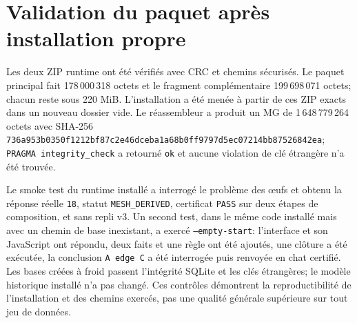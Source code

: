 \documentclass[11pt,a4paper]{book}
\begin{document}
\chapter{Validation du paquet après installation propre}
Les deux ZIP runtime ont été vérifiés avec CRC et chemins sécurisés. Le paquet principal fait 178\,000\,318 octets et le fragment complémentaire 199\,698\,071 octets; chacun reste sous 220 MiB. L'installation a été menée à partir de ces ZIP exacts dans un nouveau dossier vide. Le réassembleur a produit un MG de 1\,648\,779\,264 octets avec SHA-256 \texttt{736a953b0350f121\allowbreak{}2bf87c2e46dceba1\allowbreak{}a68b0ff9797d5ec0\allowbreak{}7214bb87526842ea}; \texttt{PRAGMA integrity\_check} a retourné \texttt{ok} et aucune violation de clé étrangère n'a été trouvée.

Le smoke test du runtime installé a interrogé le problème des œufs et obtenu la réponse réelle \texttt{18}, statut \texttt{MESH\_DERIVED}, certificat \texttt{PASS} sur deux étapes de composition, et sans repli v3. Un second test, dans le même code installé mais avec un chemin de base inexistant, a exercé \texttt{--empty-start}: l'interface et son JavaScript ont répondu, deux faits et une règle ont été ajoutés, une clôture a été exécutée, la conclusion \texttt{A edge C} a été interrogée puis renvoyée en chat certifié. Les bases créées à froid passent l'intégrité SQLite et les clés étrangères; le modèle historique installé n'a pas changé. Ces contrôles démontrent la reproductibilité de l'installation et des chemins exercés, pas une qualité générale supérieure sur tout jeu de données.
\end{document}
